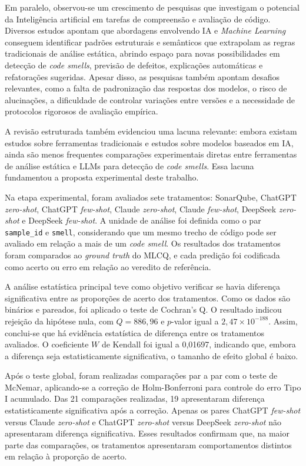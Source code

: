 Em paralelo, observou-se um crescimento de pesquisas que investigam o potencial da Inteligência artificial
em tarefas de compreensão e avaliação de código. Diversos estudos apontam que abordagens envolvendo IA e \textit{Machine Learning} conseguem
identificar padrões estruturais e semânticos que extrapolam as regras tradicionais de análise estática, abrindo espaço
para novas possibilidades em detecção de \textit{code smells}, previsão de defeitos, explicações automáticas e
refatorações sugeridas. Apesar disso, as pesquisas também apontam desafios relevantes, como a falta de padronização
das respostas dos modelos, o risco de alucinações, a dificuldade de controlar variações entre versões e a necessidade
de protocolos rigorosos de avaliação empírica.

A revisão estruturada também evidenciou uma lacuna relevante: embora existam estudos sobre ferramentas tradicionais e estudos 
sobre modelos baseados em IA, ainda são menos frequentes comparações experimentais diretas entre ferramentas de análise estática 
e LLMs para detecção de \textit{code smells}. Essa lacuna fundamentou a proposta experimental deste trabalho.

Na etapa experimental, foram avaliados sete tratamentos: SonarQube, ChatGPT \textit{zero-shot}, ChatGPT \textit{few-shot}, Claude \textit{zero-shot}, 
Claude \textit{few-shot}, DeepSeek \textit{zero-shot} e DeepSeek \textit{few-shot}. A unidade de análise foi definida como o par \texttt{sample\_id} e 
\texttt{smell}, considerando que um mesmo trecho de código pode ser avaliado em relação a mais de um \textit{code smell}. 
Os resultados dos tratamentos foram comparados ao \textit{ground truth} do MLCQ, e cada predição foi codificada como acerto 
ou erro em relação ao veredito de referência.

A análise estatística principal teve como objetivo verificar se havia diferença significativa entre as proporções de acerto 
dos tratamentos. Como os dados são binários e pareados, foi aplicado o teste de Cochran's Q. O resultado indicou rejeição da 
hipótese nula, com $Q = 886{,}96$ e $p$-valor igual a $2{,}47 \times 10^{-188}$. Assim, conclui-se que há evidência estatística 
de diferença entre os tratamentos avaliados. O coeficiente $W$ de Kendall foi igual a 0,01697, indicando que, embora a diferença 
seja estatisticamente significativa, o tamanho de efeito global é baixo.

Após o teste global, foram realizadas comparações par a par com o teste de McNemar, aplicando-se a correção de Holm-Bonferroni 
para controle do erro Tipo I acumulado. Das 21 comparações realizadas, 19 apresentaram diferença estatisticamente significativa 
após a correção. Apenas os pares ChatGPT \textit{few-shot} versus Claude \textit{zero-shot} e ChatGPT \textit{zero-shot} versus DeepSeek \textit{zero-shot} não 
apresentaram diferença significativa. Esses resultados confirmam que, na maior parte das comparações, os tratamentos apresentaram 
comportamentos distintos em relação à proporção de acerto.

